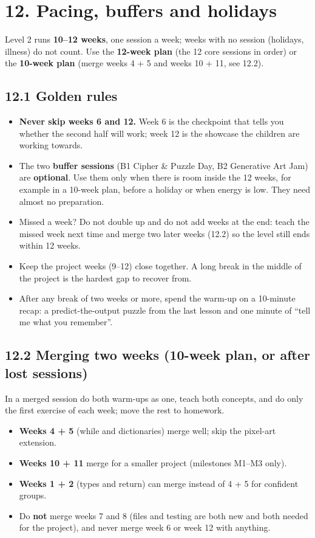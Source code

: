 \documentclass[level=2,teacher]{kidscode}
\begin{document}
\section{12. Pacing, buffers and holidays}
Level 2 runs \textbf{10--12 weeks}, one session a week; weeks with no session (holidays, illness) do
not count. Use the \textbf{12-week plan} (the 12 core sessions in order) or the \textbf{10-week plan}
(merge weeks 4 + 5 and weeks 10 + 11, see 12.2).

\subsection{12.1 Golden rules}
\begin{itemize}[itemsep=1pt]
  \item \textbf{Never skip weeks 6 and 12.} Week 6 is the checkpoint that tells you whether the
        second half will work; week 12 is the showcase the children are working towards.
  \item The two \textbf{buffer sessions} (B1 Cipher \& Puzzle Day, B2 Generative Art Jam) are
        \textbf{optional}. Use them only when there is room inside the 12 weeks, for example in a
        10-week plan, before a holiday or when energy is low. They need almost no preparation.
  \item Missed a week? Do not double up and do not add weeks at the end: teach the missed week next
        time and merge two later weeks (12.2) so the level still ends within 12 weeks.
  \item Keep the project weeks (9--12) close together. A long break in the middle of the project
        is the hardest gap to recover from.
  \item After any break of two weeks or more, spend the warm-up on a 10-minute recap: a
        predict-the-output puzzle from the last lesson and one minute of \enquote{tell me what you
        remember}.
\end{itemize}

\subsection{12.2 Merging two weeks (10-week plan, or after lost sessions)}
In a merged session do both warm-ups as one, teach both concepts, and do only the first exercise of
each week; move the rest to homework.
\begin{itemize}[itemsep=1pt]
  \item \textbf{Weeks 4 + 5} (while and dictionaries) merge well; skip the pixel-art extension.
  \item \textbf{Weeks 10 + 11} merge for a smaller project (milestones M1--M3 only).
  \item \textbf{Weeks 1 + 2} (types and return) can merge instead of 4 + 5 for confident groups.
  \item Do \textbf{not} merge weeks 7 and 8 (files and testing are both new and both needed for
        the project), and never merge week 6 or week 12 with anything.
\end{itemize}
\end{document}
